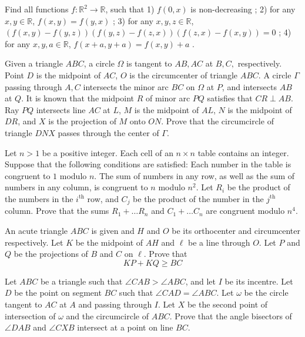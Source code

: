 \documentclass[11pt]{scrartcl}
\begin{document}
\begin{problem}[1202563402771127724]
	Find all functions $f: \mathbb{R}^2 \rightarrow \mathbb{R}$, such that
1) $f(0,x)$ is non-decreasing ;
2) for any $x,y \in \mathbb{R}$, $f(x,y)=f(y,x)$ ;
3) for any $x,y,z \in \mathbb{R}$, $(f(x,y)-f(y,z))(f(y,z)-f(z,x))(f(z,x)-f(x,y))=0$ ;
4) for any $x,y,a \in \mathbb{R}$, $f(x+a,y+a)=f(x,y)+a$ .
\end{problem}
\begin{problem}[1222382895728709073]
	Given a triangle $ABC$, a circle $\Omega$ is tangent to $AB,AC$ at $B,C,$ respectively. Point $D$ is the midpoint of $AC$, $O$ is the circumcenter of triangle $ABC$. A circle $\Gamma$ passing through $A,C$ intersects the minor arc $BC$ on $\Omega$ at $P$, and intersects $AB$ at $Q$. It is known that the midpoint $R$ of minor arc $PQ$ satisfies that $CR \perp AB$. Ray $PQ$ intersects line $AC$ at $L$, $M$ is the midpoint of $AL$, $N$ is the midpoint of $DR$, and $X$ is the projection of $M$ onto $ON$. Prove that the circumcircle of triangle $DNX$ passes through the center of $\Gamma$.
\end{problem}
\begin{problem}[1248852037865425410]
Let $n>1$ be a positive integer. Each cell of an $n\times n$ table contains an integer. Suppose that the following conditions are satisfied:
Each number in the table is congruent to $1$ modulo $n$.
The sum of numbers in any row, as well as the sum of numbers in any column, is congruent to $n$ modulo $n^2$.
Let $R_i$ be the product of the numbers in the $i^{\text{th}}$ row, and $C_j$ be the product of the number in the $j^{\text{th}}$ column. Prove that the sums $R_1+\hdots R_n$ and $C_1+\hdots C_n$ are congruent modulo $n^4$.
\end{problem}
\begin{problem}[1251781469282726042]
	An acute triangle $ABC$ is given and $H$ and $O$ be its orthocenter and circumcenter respectively. Let $K$ be the midpoint of $AH$ and $\ell$ be a line through $O. $ Let $P$ and $Q$ be the projections of $B$ and $C$ on $\ell. $ Prove that$$KP+KQ\ge BC$$
\end{problem}
\begin{problem}[1266870846109464791]
	Let $ABC$ be a triangle such that $\angle CAB > \angle ABC$, and let $I$ be its incentre. Let $D$ be the point on segment $BC$ such that $\angle CAD = \angle ABC$. Let $\omega$ be the circle tangent to $AC$ at $A$ and passing through $I$. Let $X$ be the second point of intersection of $\omega$ and the circumcircle of $ABC$. Prove that the angle bisectors of $\angle DAB$ and $\angle CXB$ intersect at a point on line $BC$.
\end{problem}
\end{document}
